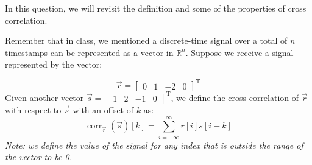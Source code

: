 In this question, we will revisit the definition and some of the properties of cross correlation. 

Remember that in class, we mentioned a discrete-time signal over a total of $n$ timestamps can be represented as a vector in $\mathbb{R}^n$. Suppose we receive a signal represented by the vector:


$$\vec{r} = \begin{bmatrix}
0 & 1 & -2 & 0
\end{bmatrix}^\mathrm{T}$$
Given another vector $\vec{s} = \begin{bmatrix}1 & 2 & -1 & 0\end{bmatrix}^\mathrm{T}$, we define the cross correlation of $\vec{r}$ with respect to $\vec{s}$ with an offset of $k$ as:
    $$\operatorname{corr}_{\vec{r}}(\vec{s})[k]=\sum_{i=-\infty}^{\infty} r[i] s[i-k]$$
    \textit{Note: we define the value of the signal for any index that is outside the range of the vector to be 0.}
    
    
